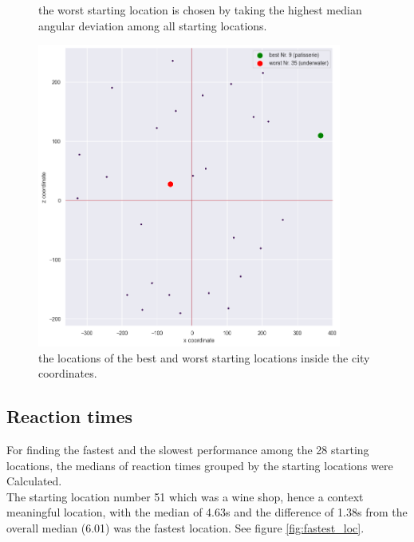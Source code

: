 \begin{figure}[!h]
	\caption[Worst starting location based on angular deviation]{the worst starting location is chosen by taking the highest median angular deviation among all starting locations.}
\end{figure}
\label{fig:worst_location}

\begin{figure}[h]
	\centering
	\includegraphics[width=100mm]{figures/best_worst_starting_locations.png}
	\caption[Locations of best and worst starting locations in city]{the locations of the best and worst starting locations inside the city coordinates.}
	\label{fig:best_worst_locs}
\end{figure}


\subsection{Reaction times}

For finding the fastest and the slowest performance among the 28 starting locations, the medians of reaction times grouped by the starting locations were Calculated.\\
The starting location number 51 which was a wine shop, hence a context meaningful location, with the median of 4.63s and the difference of 1.38s from the overall median (6.01) was the fastest location. See figure \ref{fig:fastest_loc}.\\

